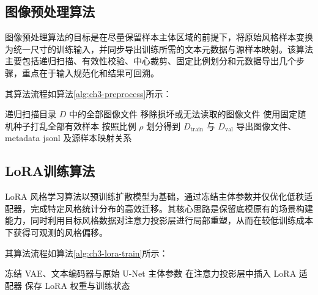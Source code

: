
\subsection{图像预处理算法}

图像预处理算法的目标是在尽量保留样本主体区域的前提下，将原始风格样本变换为统一尺寸的训练输入，并同步导出训练所需的文本元数据与源样本映射。该算法主要包括递归扫描、有效性校验、中心裁剪、固定比例划分和元数据导出几个步骤，重点在于输入规范化和结果可回溯。

其算法流程如算法\ref{alg:ch3-preprocess}所示：

\begin{algorithm}[H]
\caption{图像预处理算法}
\label{alg:ch3-preprocess}
递归扫描目录 $D$ 中的全部图像文件\;
移除损坏或无法读取的图像文件\;
使用固定随机种子打乱全部有效样本\;
按照比例 $\rho$ 划分得到 $D_{\mathrm{train}}$ 与 $D_{\mathrm{val}}$\;
导出图像文件、metadata jsonl 及源样本映射关系\;
\end{algorithm}

\subsection{LoRA训练算法}

LoRA 风格学习算法以预训练扩散模型为基础，通过冻结主体参数并仅优化低秩适配器，完成特定风格统计分布的高效迁移。其核心思路是保留底模原有的场景构建能力，同时利用目标风格数据对注意力投影层进行局部重塑，从而在较低训练成本下获得可观测的风格偏移。

其算法流程如算法\ref{alg:ch3-lora-train}所示：

\begin{algorithm}[H]
\caption{LoRA 风格适配训练算法}
\label{alg:ch3-lora-train}
冻结 VAE、文本编码器与原始 U-Net 主体参数\;
在注意力投影层中插入 LoRA 适配器\;
保存 LoRA 权重与训练状态\;
\end{algorithm}

